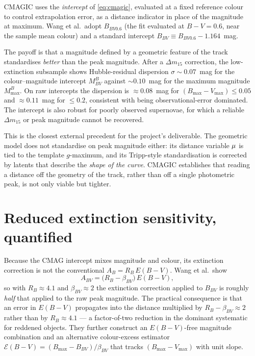 \documentclass[11pt]{article}
\begin{document}
CMAGIC uses the \emph{intercept} of \eqref{eq:cmagic}, evaluated at a fixed reference
colour to control extrapolation error, as a distance indicator in place of the
magnitude at maximum. Wang et al.\ adopt $B_{BV0.6}$ (the fit evaluated at $B-V=0.6$,
near the sample mean colour) and a standard intercept $B_{BV} \equiv B_{BV0.6} -
1.164$~mag.

The payoff is that a magnitude defined by a geometric feature of the track
standardises \emph{better} than the peak magnitude. After a $\Delta m_{15}$
correction, the low-extinction subsample shows Hubble-residual dispersion
$\sigma \sim 0.07$~mag for the colour--magnitude intercept $M^{B}_{BV}$ against
$\sim 0.10$~mag for the maximum magnitude $M^{B}_{\max}$. On raw intercepts the
dispersion is $\approx 0.08$~mag for $(B_{\max}-V_{\max}) \le 0.05$ and $\approx
0.11$~mag for $\le 0.2$, consistent with being observational-error dominated. The
intercept is also robust for poorly observed supernovae, for which a reliable
$\Delta m_{15}$ or peak magnitude cannot be recovered.

This is the closest external precedent for the project's deliverable. The geometric
model does not standardise on peak magnitude either: its distance variable $\mu$ is
tied to the template $g$-maximum, and its Tripp-style standardisation is corrected by
latents that describe the \emph{shape of the curve}. CMAGIC establishes that reading
a distance off the geometry of the track, rather than off a single photometric peak,
is not only viable but tighter.

\section{Reduced extinction sensitivity, quantified}

Because the CMAG intercept mixes magnitude and colour, its extinction correction is
not the conventional $A_{B} = R_{B}\,E(B-V)$. Wang et al.\ show
\begin{equation}
  A_{BV} = \bigl(R_{B} - \beta_{BV}\bigr)\,E(B-V),
  \label{eq:extcorr}
\end{equation}
so with $R_{B} \approx 4.1$ and $\beta_{BV} \approx 2$ the extinction correction
applied to $B_{BV}$ is roughly \emph{half} that applied to the raw peak magnitude.
The practical consequence is that an error in $E(B-V)$ propagates into the distance
multiplied by $R_{B}-\beta_{BV} \approx 2$ rather than by $R_{B} \approx 4.1$ --- a
factor-of-two reduction in the dominant systematic for reddened objects. They further
construct an $E(B-V)$-free magnitude combination and an alternative colour-excess
estimator $\mathcal{E}(B-V) = (B_{\max}-B_{BV})/\beta_{BV}$ that tracks
$(B_{\max}-V_{\max})$ with unit slope.
\end{document}
